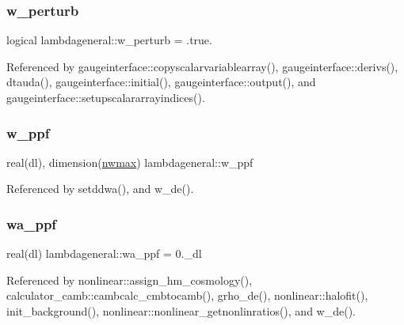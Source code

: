 \mbox{\label{namespacelambdageneral_aaccd65e521dd501c9ee6c8e77a95ffef}} 
\subsubsection{\texorpdfstring{w\+\_\+perturb}{w\_perturb}}
{\footnotesize\ttfamily logical lambdageneral\+::w\+\_\+perturb = .true.}



Referenced by gaugeinterface\+::copyscalarvariablearray(), gaugeinterface\+::derivs(), dtauda(), gaugeinterface\+::initial(), gaugeinterface\+::output(), and gaugeinterface\+::setupscalararrayindices().

\mbox{\label{namespacelambdageneral_a7e860fa5106918f839ea3f7f76862f56}} 
\subsubsection{\texorpdfstring{w\+\_\+ppf}{w\_ppf}}
{\footnotesize\ttfamily real(dl), dimension(\mbox{\hyperlink{namespacelambdageneral_a72ab4fcacd74a66fe577794d5294864b}{nwmax}}) lambdageneral\+::w\+\_\+ppf}



Referenced by setddwa(), and w\+\_\+de().

\mbox{\label{namespacelambdageneral_a175aaf4fc2698fa3d615510feb82f3ee}} 
\subsubsection{\texorpdfstring{wa\+\_\+ppf}{wa\_ppf}}
{\footnotesize\ttfamily real(dl) lambdageneral\+::wa\+\_\+ppf = 0.\+\_\+dl}



Referenced by nonlinear\+::assign\+\_\+hm\+\_\+cosmology(), calculator\+\_\+camb\+::cambcalc\+\_\+cmbtocamb(), grho\+\_\+de(), nonlinear\+::halofit(), init\+\_\+background(), nonlinear\+::nonlinear\+\_\+getnonlinratios(), and w\+\_\+de().

